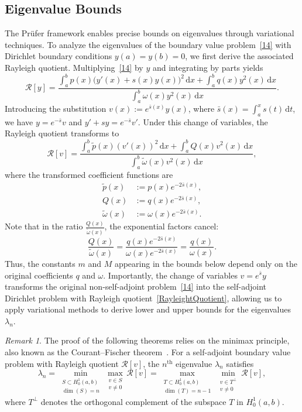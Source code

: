 \documentclass[11pt, reqno]{amsart}
\numberwithin{equation}{section}  %
\theoremstyle{plain}
\theoremstyle{definition}
\theoremstyle{remark}
\newtheorem{remark}[theorem]{Remark}
\begin{document}
\subsection{Eigenvalue Bounds}

The Pr\"ufer framework enables precise bounds on eigenvalues through variational techniques. To analyze the eigenvalues of the boundary value problem~\eqref{14} with Dirichlet boundary conditions $y(a) = y(b) = 0$, we first derive the associated Rayleigh quotient. Multiplying~\eqref{14} by $y$ and integrating by parts yields
\[
\mathcal{R}[y] = \frac{\displaystyle\int_a^b p(x)\bigl(y'(x) + s(x)y(x)\bigr)^2\,\mathrm{d}x + \int_a^b q(x)y^2(x)\,\mathrm{d}x}{\displaystyle\int_a^b \omega(x)y^2(x)\,\mathrm{d}x}.
\]
Introducing the substitution $v(x) := e^{\bar{s}(x)}y(x)$, where $\bar{s}(x) = \int_a^x s(t)\,\mathrm{d}t$, we have $y = e^{-\bar{s}}v$ and $y' + sy = e^{-\bar{s}}v'$. Under this change of variables, the Rayleigh quotient transforms to
\begin{equation}\label{RayleightQuotient}
\mathcal{R}[v] = \frac{\displaystyle\int_a^b \tilde{p}(x)(v'(x))^2\,\mathrm{d}x + \int_a^b Q(x)v^2(x)\,\mathrm{d}x}{\displaystyle\int_a^b \tilde{\omega}(x)v^2(x)\,\mathrm{d}x},
\end{equation}
where the transformed coefficient functions are
\begin{align}
\tilde{p}(x) &:= p(x)e^{-2\bar{s}(x)}, \label{eq:ptilde}\\
Q(x) &:= q(x)e^{-2\bar{s}(x)}, \label{associatedcoefficient}\\
\tilde{\omega}(x) &:= \omega(x)e^{-2\bar{s}(x)}. \label{eq:omegatilde}
\end{align}
Note that in the ratio $\frac{Q(x)}{\tilde{\omega}(x)}$, the exponential factors cancel:
\[
\frac{Q(x)}{\tilde{\omega}(x)} = \frac{q(x)e^{-2\bar{s}(x)}}{\omega(x)e^{-2\bar{s}(x)}} = \frac{q(x)}{\omega(x)}.
\]
Thus, the constants $m$ and $M$ appearing in the bounds below depend only on the original coefficients $q$ and $\omega$. Importantly, the change of variables $v = e^{\bar{s}}y$ transforms the original non-self-adjoint problem~\eqref{14} into the self-adjoint Dirichlet problem with Rayleigh quotient~\eqref{RayleightQuotient}, allowing us to apply variational methods to derive lower and upper bounds for the eigenvalues $\lambda_n$.

\begin{remark}{\rm The proof of the following theorems relies on the minimax principle, also known as the Courant--Fischer theorem~\cite{fischer1905,courant1920}. For a self-adjoint boundary value problem with Rayleigh quotient $\mathcal{R}[v]$, the $n^{\text{th}}$ eigenvalue $\lambda_n$ satisfies
\[
\lambda_n = \min_{\substack{S \subset H_0^1(a,b) \\ \dim(S) = n}} \max_{\substack{v \in S \\ v \neq 0}} \mathcal{R}[v] = \max_{\substack{T \subset H_0^1(a,b) \\ \dim(T) = n-1}} \min_{\substack{v \in T^\perp \\ v \neq 0}} \mathcal{R}[v],
\]
where $T^\perp$ denotes the orthogonal complement of the subspace $T$ in $H_0^1(a,b)$.}
\end{remark}
\end{document}
